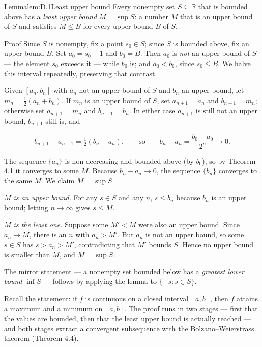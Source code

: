 \documentclass[a4paper,12pt,oneside]{memoir}
\begin{document}
\begin{envtheorem}{Lemma}{lem:D.1}{Least upper bound}
Every nonempty set \(S \subseteq \mathbb{R}\) that is bounded above has a \emph{least upper bound} \(M = \sup S\): a number \(M\) that is an upper bound of \(S\) and satisfies \(M \le B\) for every upper bound \(B\) of \(S\).
\end{envtheorem}
\begin{envproof}{Proof}{}{}
Since \(S\) is nonempty, fix a point \(s_{0} \in S\); since \(S\) is bounded above, fix an upper bound \(B\). Set \(a_{0} = s_{0} - 1\) and \(b_{0} = B\). Then \(a_{0}\) is \emph{not} an upper bound of \(S\) — the element \(s_{0}\) exceeds it — while \(b_{0}\) is; and \(a_{0} < b_{0}\), since \(s_{0} \le B\). We halve this interval repeatedly, preserving that contrast.

Given \([a_{n}, b_{n}]\) with \(a_{n}\) not an upper bound of \(S\) and \(b_{n}\) an upper bound, let \(m_{n} = \tfrac{1}{2}(a_{n} + b_{n})\). If \(m_{n}\) is an upper bound of \(S\), set \(a_{n+1} = a_{n}\) and \(b_{n+1} = m_{n}\); otherwise set \(a_{n+1} = m_{n}\) and \(b_{n+1} = b_{n}\). In either case \(a_{n+1}\) is still not an upper bound, \(b_{n+1}\) still is, and

\[ b_{n+1} - a_{n+1} = \tfrac{1}{2}(b_{n} - a_{n}), \qquad \text{so} \qquad b_{n} - a_{n} = \frac{b_{0} - a_{0}}{2^{n}} \to 0. \]

The sequence \(\{a_{n}\}\) is non-decreasing and bounded above (by \(b_{0}\)), so by Theorem 4.1 it converges to some \(M\). Because \(b_{n} - a_{n} \to 0\), the sequence \(\{b_{n}\}\) converges to the same \(M\). We claim \(M = \sup S\).

\emph{\(M\) is an upper bound.} For any \(s \in S\) and any \(n\), \(s \le b_{n}\) because \(b_{n}\) is an upper bound; letting \(n \to \infty\) gives \(s \le M\).

\emph{\(M\) is the least one.} Suppose some \(M' < M\) were also an upper bound. Since \(a_{n} \to M\), there is an \(n\) with \(a_{n} > M'\). But \(a_{n}\) is not an upper bound, so some \(s \in S\) has \(s > a_{n} > M'\), contradicting that \(M'\) bounds \(S\). Hence no upper bound is smaller than \(M\), and \(M = \sup S\). \qedmark
\end{envproof}
The mirror statement — a nonempty set bounded below has a \emph{greatest lower bound} \(\inf S\) — follows by applying the lemma to \(\{-s : s \in S\}\).

Recall the statement: if \(f\) is continuous on a closed interval \([a, b]\), then \(f\) attains a maximum and a minimum on \([a, b]\). The proof runs in two stages — first that the values are bounded, then that the least upper bound is actually reached — and both stages extract a convergent subsequence with the Bolzano–Weierstrass theorem (Theorem 4.4).
\end{document}
